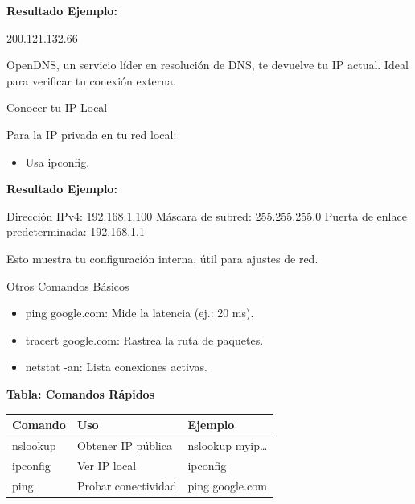 \documentclass[
  doc,
  floatsintext,
  longtable,
  a4paper,
  nolmodern,
  notxfonts,
  notimes,
  12pt,
  colorlinks=true,linkcolor=blue,citecolor=blue,urlcolor=blue]{apa7}
\newenvironment{Shaded}{\begin{snugshade}}{\end{snugshade}}
\newcommand{\NormalTok}[1]{\textcolor[rgb]{0.00,0.23,0.31}{#1}}
\providecommand{\tightlist}{%
  \setlength{\itemsep}{0pt}\setlength{\parskip}{0pt}}
\newcounter{none} %
\begin{document}
\textbf{Resultado Ejemplo:}

\begin{Shaded}
\begin{Highlighting}[]
\NormalTok{200.121.132.66}
\end{Highlighting}
\end{Shaded}

OpenDNS, un servicio líder en resolución de DNS, te devuelve tu IP
actual. Ideal para verificar tu conexión externa.

Conocer tu IP Local

Para la IP privada en tu red local:

\begin{itemize}
\tightlist
\item
  Usa ipconfig.
\end{itemize}

\textbf{Resultado Ejemplo:}

\begin{Shaded}
\begin{Highlighting}[]
\NormalTok{Dirección IPv4: 192.168.1.100}
\NormalTok{Máscara de subred: 255.255.255.0}
\NormalTok{Puerta de enlace predeterminada: 192.168.1.1}
\end{Highlighting}
\end{Shaded}

Esto muestra tu configuración interna, útil para ajustes de red.

Otros Comandos Básicos

\begin{itemize}
\tightlist
\item
  ping google.com: Mide la latencia (ej.: 20 ms).
\item
  tracert google.com: Rastrea la ruta de paquetes.
\item
  netstat -an: Lista conexiones activas.
\end{itemize}

\textbf{Tabla: Comandos Rápidos}

{\def\LTcaptype{none} %
\begin{longtable}[]{@{}lll@{}}
\toprule\noalign{}
Comando & Uso & Ejemplo \\
\midrule\noalign{}
\endhead
\bottomrule\noalign{}
\endlastfoot
nslookup & Obtener IP pública & nslookup myip\ldots{} \\
ipconfig & Ver IP local & ipconfig \\
ping & Probar conectividad & ping google.com \\
\end{longtable}
}
\end{document}
